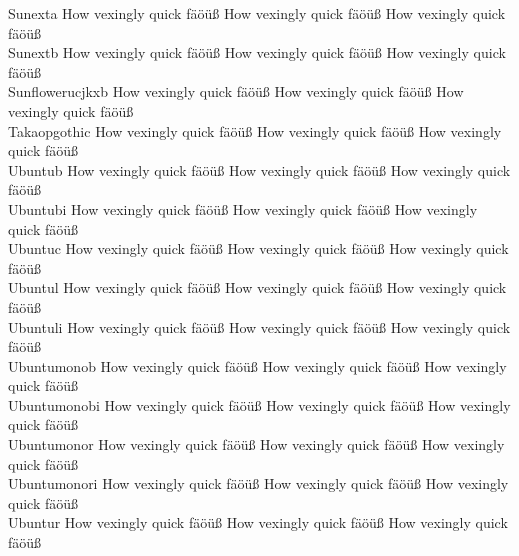 \begin{tabbing}
Sunexta \> {\mktsStyleNormal{}How vexingly quick fäöüß} {\mktsFontfileSunexta{}How vexingly quick fäöüß} {\mktsStyleItalic{}How vexingly quick fäöüß} \\
Sunextb \> {\mktsStyleNormal{}How vexingly quick fäöüß} {\mktsFontfileSunextb{}How vexingly quick fäöüß} {\mktsStyleItalic{}How vexingly quick fäöüß} \\
Sunflowerucjkxb \> {\mktsStyleNormal{}How vexingly quick fäöüß} {\mktsFontfileSunflowerucjkxb{}How vexingly quick fäöüß} {\mktsStyleItalic{}How vexingly quick fäöüß} \\
Takaopgothic \> {\mktsStyleNormal{}How vexingly quick fäöüß} {\mktsFontfileTakaopgothic{}How vexingly quick fäöüß} {\mktsStyleItalic{}How vexingly quick fäöüß} \\
Ubuntub \> {\mktsStyleNormal{}How vexingly quick fäöüß} {\mktsFontfileUbuntub{}How vexingly quick fäöüß} {\mktsStyleItalic{}How vexingly quick fäöüß} \\
Ubuntubi \> {\mktsStyleNormal{}How vexingly quick fäöüß} {\mktsFontfileUbuntubi{}How vexingly quick fäöüß} {\mktsStyleItalic{}How vexingly quick fäöüß} \\
Ubuntuc \> {\mktsStyleNormal{}How vexingly quick fäöüß} {\mktsFontfileUbuntuc{}How vexingly quick fäöüß} {\mktsStyleItalic{}How vexingly quick fäöüß} \\
Ubuntul \> {\mktsStyleNormal{}How vexingly quick fäöüß} {\mktsFontfileUbuntul{}How vexingly quick fäöüß} {\mktsStyleItalic{}How vexingly quick fäöüß} \\
Ubuntuli \> {\mktsStyleNormal{}How vexingly quick fäöüß} {\mktsFontfileUbuntuli{}How vexingly quick fäöüß} {\mktsStyleItalic{}How vexingly quick fäöüß} \\
Ubuntumonob \> {\mktsStyleNormal{}How vexingly quick fäöüß} {\mktsFontfileUbuntumonob{}How vexingly quick fäöüß} {\mktsStyleItalic{}How vexingly quick fäöüß} \\
Ubuntumonobi \> {\mktsStyleNormal{}How vexingly quick fäöüß} {\mktsFontfileUbuntumonobi{}How vexingly quick fäöüß} {\mktsStyleItalic{}How vexingly quick fäöüß} \\
Ubuntumonor \> {\mktsStyleNormal{}How vexingly quick fäöüß} {\mktsFontfileUbuntumonor{}How vexingly quick fäöüß} {\mktsStyleItalic{}How vexingly quick fäöüß} \\
Ubuntumonori \> {\mktsStyleNormal{}How vexingly quick fäöüß} {\mktsFontfileUbuntumonori{}How vexingly quick fäöüß} {\mktsStyleItalic{}How vexingly quick fäöüß} \\
Ubuntur \> {\mktsStyleNormal{}How vexingly quick fäöüß} {\mktsFontfileUbuntur{}How vexingly quick fäöüß} {\mktsStyleItalic{}How vexingly quick fäöüß} \\

\end{tabbing}
